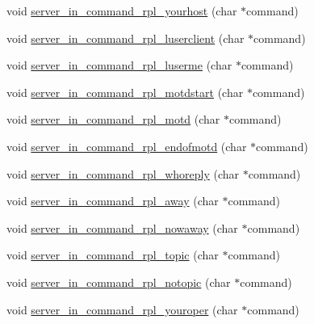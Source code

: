 \begin{DoxyCompactItemize}
\item 
void \hyperlink{G-2313-06-P2__client__function__handlers_8c_a3f4cf6c0d74b06a0916f7a9619972eee}{server\+\_\+in\+\_\+command\+\_\+rpl\+\_\+yourhost} (char $\ast$command)
\item 
void \hyperlink{G-2313-06-P2__client__function__handlers_8c_af5091cf59cbab7ce259c405c019fa8dd}{server\+\_\+in\+\_\+command\+\_\+rpl\+\_\+luserclient} (char $\ast$command)
\item 
void \hyperlink{G-2313-06-P2__client__function__handlers_8c_a5764225aa28906c7ccebf0996b2c5a08}{server\+\_\+in\+\_\+command\+\_\+rpl\+\_\+luserme} (char $\ast$command)
\item 
void \hyperlink{G-2313-06-P2__client__function__handlers_8c_acd688f18855dcb6ee9bf10a72e0c8f6c}{server\+\_\+in\+\_\+command\+\_\+rpl\+\_\+motdstart} (char $\ast$command)
\item 
void \hyperlink{G-2313-06-P2__client__function__handlers_8c_a774c98f4ea94eb6f92a5b22d33030674}{server\+\_\+in\+\_\+command\+\_\+rpl\+\_\+motd} (char $\ast$command)
\item 
void \hyperlink{G-2313-06-P2__client__function__handlers_8c_ad22233e08c30cad9e0598f80b5b38744}{server\+\_\+in\+\_\+command\+\_\+rpl\+\_\+endofmotd} (char $\ast$command)
\item 
void \hyperlink{G-2313-06-P2__client__function__handlers_8c_a86782df5d9b151dd061b9831a47a2c5f}{server\+\_\+in\+\_\+command\+\_\+rpl\+\_\+whoreply} (char $\ast$command)
\item 
void \hyperlink{G-2313-06-P2__client__function__handlers_8c_add282510a7e92a90d45091e6dc3a3488}{server\+\_\+in\+\_\+command\+\_\+rpl\+\_\+away} (char $\ast$command)
\item 
void \hyperlink{G-2313-06-P2__client__function__handlers_8c_ada377e1754f9a22a2ebe0bada8838b5b}{server\+\_\+in\+\_\+command\+\_\+rpl\+\_\+nowaway} (char $\ast$command)
\item 
void \hyperlink{G-2313-06-P2__client__function__handlers_8c_abc030e3bc9ce4ad126ea2c66e304e2d5}{server\+\_\+in\+\_\+command\+\_\+rpl\+\_\+topic} (char $\ast$command)
\item 
void \hyperlink{G-2313-06-P2__client__function__handlers_8c_ab9b55bd1e18bde61e8327fcf6936d91f}{server\+\_\+in\+\_\+command\+\_\+rpl\+\_\+notopic} (char $\ast$command)
\item 
void \hyperlink{G-2313-06-P2__client__function__handlers_8c_a24bb76a5941798964a8dd18e1cfb1d81}{server\+\_\+in\+\_\+command\+\_\+rpl\+\_\+youroper} (char $\ast$command)
\item 

\end{DoxyCompactItemize}
